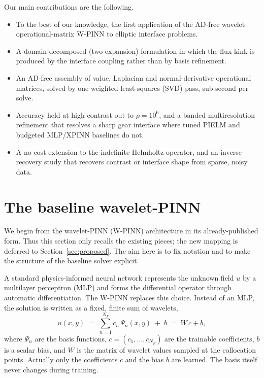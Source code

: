 \documentclass[pdflatex,sn-mathphys-num]{sn-jnl}%
\theoremstyle{thmstyleone}%
\theoremstyle{thmstyletwo}%
\theoremstyle{thmstylethree}%
\begin{document}
Our main contributions are the following.
\begin{itemize}
\item To the best of our knowledge, the first application of the AD-free wavelet operational-matrix W-PINN to elliptic interface problems.
\item A domain-decomposed (two-expansion) formulation in which the flux kink is produced by the interface coupling rather than by basis refinement.
\item An AD-free assembly of value, Laplacian and normal-derivative operational matrices, solved by one weighted least-squares (SVD) pass, sub-second per solve.
\item Accuracy held at high contrast out to $\rho=10^6$, and a banded multiresolution refinement that resolves a sharp gear interface where tuned PIELM and budgeted MLP/XPINN baselines do not.
\item A no-cost extension to the indefinite Helmholtz operator, and an inverse-recovery study that recovers contrast or interface shape from sparse, noisy data.
\end{itemize}

\section{The baseline wavelet-PINN}\label{sec:baseline}

We begin from the wavelet-PINN (W-PINN) architecture in its already-published form. Thus this section only recalls the existing pieces; the new mapping is deferred to Section~\ref{sec:proposed}. The aim here is to fix notation and to make the structure of the baseline solver explicit.

A standard physics-informed neural network represents the unknown field $u$ by a multilayer perceptron (MLP) and forms the differential operator through automatic differentiation. The W-PINN replaces this choice. Instead of an MLP, the solution is written as a fixed, finite sum of wavelets,
\begin{equation}
u(x,y) \;=\; \sum_{n=1}^{N_F} c_n\,\Psi_n(x,y) \;+\; b \;=\; W\,c + b,
\label{eq:expansion}
\end{equation}
where $\Psi_n$ are the basis functions, $c=(c_1,\dots,c_{N_F})$ are the trainable coefficients, $b$ is a scalar bias, and $W$ is the matrix of wavelet values sampled at the collocation points. Actually only the coefficients $c$ and the bias $b$ are learned. The basis itself never changes during training.
\end{document}
